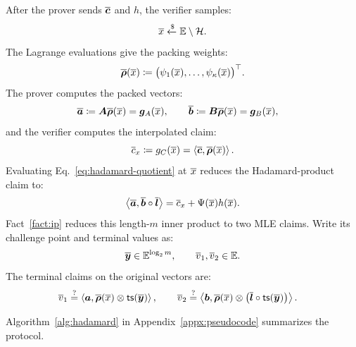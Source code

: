 After the prover sends \(\overline{\bm c}\) and \(h\), the verifier
samples:
\[
    \overline{x}
    \mathrel{\xleftarrow{\$}}
    \mathbb{E}\setminus\mathcal H.
\]
The Lagrange evaluations give the packing weights:
\[
    \overline{\bm\rho}(\overline{x})
    \coloneqq
    \bigl(
        \psi_1(\overline{x}),\ldots,\psi_\kappa(\overline{x})
    \bigr)^\top.
\]
The prover computes the packed vectors:
\[
\begin{aligned}
    \overline{\bm a}
    &\coloneqq
    \bm A\overline{\bm\rho}(\overline{x})
    =
    \bm g_A(\overline{x}),
    \qquad
    \overline{\bm b}
    \coloneqq
    \bm B\overline{\bm\rho}(\overline{x})
    =
    \bm g_B(\overline{x}),
\end{aligned}
\]
and the verifier computes the interpolated claim:
\[
    \overline{c}_x
    \coloneqq
    g_C(\overline{x})
    =
    \left\langle
        \overline{\bm c},
        \overline{\bm\rho}(\overline{x})
    \right\rangle.
\]
Evaluating Eq.~\eqref{eq:hadamard-quotient} at \(\overline{x}\)
reduces the Hadamard-product claim to:
\begin{equation*}
    \left\langle
        \overline{\bm a},
        \overline{\bm b}\circ\overline{\bm l}
    \right\rangle
    =
    \overline{c}_x
    +
    \Psi(\overline{x})h(\overline{x}).
\end{equation*}
Fact~\ref{fact:ip} reduces this length-\(m\) inner product to two
MLE claims. Write its challenge point and terminal values as:
\[
    \overline{\bm y}\in\mathbb{E}^{\log_2m},
    \qquad
    \overline{v}_1,\overline{v}_2\in\mathbb{E}.
\]
The terminal claims on the original vectors are:
\begin{align}
\label{eq:hadamard-terminal}
    \overline{v}_1
    &\mathrel{\overset{\mathrm{?}}{=}}
    \left\langle
        \bm a,
        \overline{\bm\rho}(\overline{x})
        \mathbin{\otimes}
        {\sf ts}(\overline{\bm y})
    \right\rangle,
    \qquad
    \overline{v}_2
    \mathrel{\overset{\mathrm{?}}{=}}
    \left\langle
        \bm b,
        \overline{\bm\rho}(\overline{x})
        \mathbin{\otimes}
        \left(
            \overline{\bm l}
            \circ
            {\sf ts}(\overline{\bm y})
        \right)
    \right\rangle.
\end{align}

Algorithm~\ref{alg:hadamard} in Appendix~\ref{appx:pseudocode}
summarizes the protocol.

